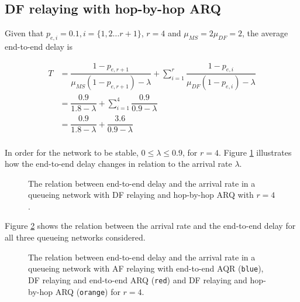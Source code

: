 \subsection{DF relaying with hop-by-hop ARQ}

Given that $p_{e,i} = 0.1, i = \{1,2 \dots r+1\}$, $r=4$ and
$\mu_{MS} = 2\mu_{DF} = 2$, the average end-to-end delay is

\begin{align*}
  T &= \dfrac{1 - p_{e,r+1}}{\mu_{MS}(1 - p_{e,r+1}) - \lambda} + \sum\limits_{i=1}^r \dfrac{1-p_{e,i}}{\mu_{DF} (1 - p_{e,i}) - \lambda} \\
  ~ &= \dfrac{0.9}{1.8 - \lambda} + \sum\limits_{i=1}^4 \dfrac{0.9}{0.9 - \lambda} \\
  ~ &= \dfrac{0.9}{1.8 - \lambda} + \dfrac{3.6}{0.9 - \lambda} \\
\end{align*}

In order for the network to be stable,
$0 \leq \lambda \leq 0.9$, for $r=4$. Figure
\ref{fig:05_arrival_rate_df_hbh} illustrates how the end-to-end delay changes in
relation to the arrival rate $\lambda$.

\begin{figure}\centering
  
  \caption{The relation between end-to-end delay and the arrival rate in a
    queueing network with DF relaying and hop-by-hop ARQ with $r=4$.}
  \label{fig:05_arrival_rate_df_hbh}
\end{figure}


Figure \ref{fig:05_arrival_rates} shows the relation between the arrival rate
and the end-to-end delay for all three queueing networks considered.

\begin{figure}\centering
  
  \caption{The relation between end-to-end delay and the arrival rate in a
    queueing network with AF relaying with end-to-end AQR (\texttt{blue}),
    DF relaying and end-to-end ARQ (\texttt{red}) and
    DF relaying and hop-by-hop ARQ (\texttt{orange}) for $r=4$.}
  \label{fig:05_arrival_rates}
\end{figure}
